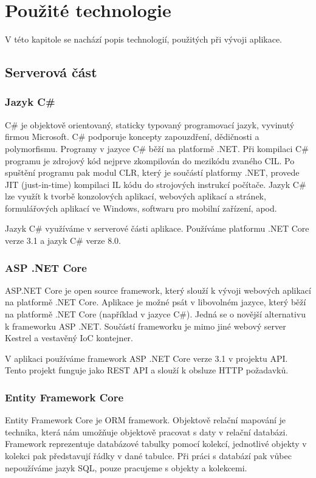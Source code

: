
\chapter{Použité technologie}

V této kapitole se nachází popis technologií, použitých při vývoji aplikace.

\section{Serverová část}

\subsection{Jazyk C\#}
C\# je objektově orientovaný, staticky typovaný programovací jazyk, vyvinutý firmou Microsoft.
C\# podporuje koncepty zapouzdření, dědičnosti a polymorfismu. Programy v jazyce C\# běží na platformě .NET. 
Při kompilaci C\# programu je zdrojový kód nejprve zkompilován do mezikódu zvaného CIL. 
Po spuštění programu pak modul CLR, který je součástí platformy .NET, provede JIT (just-in-time) kompilaci IL kódu do strojových instrukcí počítače.
Jazyk C\# lze využít k tvorbě konzolových aplikací, webových aplikací a stránek, formulářových aplikací ve Windows, softwaru pro mobilní zařízení, apod. 
\cite{CSharpDocs}

Jazyk C\# využíváme v serverové části aplikace. Používáme platformu .NET Core verze 3.1 a jazyk C\# verze 8.0.

\subsection{ASP .NET Core}
ASP.NET Core je open source framework, který slouží k vývoji webových aplikací na platformě .NET Core. Aplikace je možné psát v libovolném jazyce, který běží na platformě .NET Core (například v jazyce C\#). Jedná se o novější alternativu k frameworku ASP .NET. Součástí frameworku je mimo jiné webový server Kestrel a vestavěný IoC kontejner.
\cite{AspNetCoreDocs}

V aplikaci používáme framework ASP .NET Core verze 3.1 v projektu API. Tento projekt funguje jako REST API a slouží k obsluze HTTP požadavků.

\subsection{Entity Framework Core}
Entity Framework Core je ORM framework. Objektově relační mapování je technika, která nám umožňuje objektově pracovat s daty v relační databázi. Framework reprezentuje databázové tabulky pomocí kolekcí, jednotlivé objekty v kolekci pak představují řádky v dané tabulce. Při práci s databází pak vůbec nepoužíváme jazyk SQL, pouze pracujeme s objekty a kolekcemi.
\cite{EfCoreDocs}

